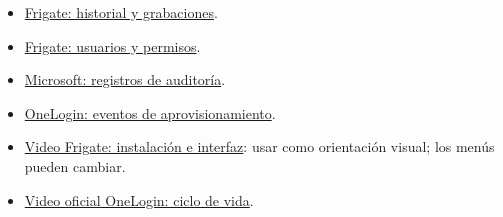 \documentclass[12pt,a4paper]{article}
\begin{document}
\begin{itemize}
\item \href{https://docs.frigate.video/configuration/record/}{Frigate: historial y grabaciones}.
\item \href{https://docs.frigate.video/configuration/authentication/}{Frigate: usuarios y permisos}.
\item \href{https://learn.microsoft.com/en-us/entra/identity/monitoring-health/concept-audit-logs}{Microsoft: registros de auditoría}.
\item \href{https://onelogin.service-now.com/kb?id=kb_article_view&sysparm_article=KB0010298}{OneLogin: eventos de aprovisionamiento}.
\item \href{https://www.youtube.com/watch?v=KMD72_Wfp3E}{Video Frigate: instalación e interfaz}: usar como orientación visual; los menús pueden cambiar.
\item \href{https://www.onelogin.com/resource-center/videos/getting-started-with-identity-lifecycle-management-pt-2}{Video oficial OneLogin: ciclo de vida}.
\end{itemize}
\end{document}
